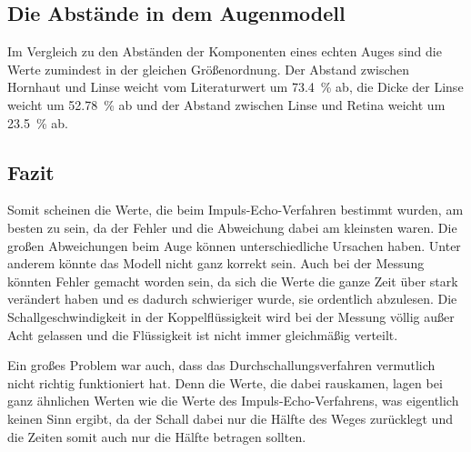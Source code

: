 \subsection{Die Abstände in dem Augenmodell}
Im Vergleich zu den Abständen der Komponenten eines echten Auges sind die Werte zumindest in der gleichen Größenordnung. 
Der Abstand zwischen Hornhaut und Linse weicht vom Literaturwert um \SI{73.4}{\percent} ab, die Dicke der Linse weicht um \SI{52.78}{\percent} 
ab und der Abstand zwischen Linse und Retina weicht um \SI{23.5}{\percent} ab.
\subsection{Fazit}
Somit scheinen die Werte, die beim Impuls-Echo-Verfahren bestimmt wurden, am besten zu sein, da der Fehler und die Abweichung dabei am kleinsten waren. 
Die großen Abweichungen beim Auge können unterschiedliche Ursachen haben. Unter anderem könnte das Modell nicht ganz korrekt sein. Auch bei der 
Messung könnten Fehler gemacht worden sein, da sich die Werte die ganze Zeit über stark verändert haben und es dadurch schwieriger wurde, sie ordentlich abzulesen.
Die Schallgeschwindigkeit in der Koppelflüssigkeit wird bei der Messung völlig außer Acht gelassen und die Flüssigkeit ist nicht 
immer gleichmäßig verteilt.

\noindent Ein großes Problem war auch, dass das Durchschallungsverfahren vermutlich nicht richtig funktioniert hat. Denn die Werte, die dabei rauskamen, lagen bei ganz 
ähnlichen Werten wie die Werte des Impuls-Echo-Verfahrens, was eigentlich keinen Sinn ergibt, da der Schall dabei nur die Hälfte des Weges zurücklegt 
und die Zeiten somit auch nur die Hälfte betragen sollten. 

\newpage
